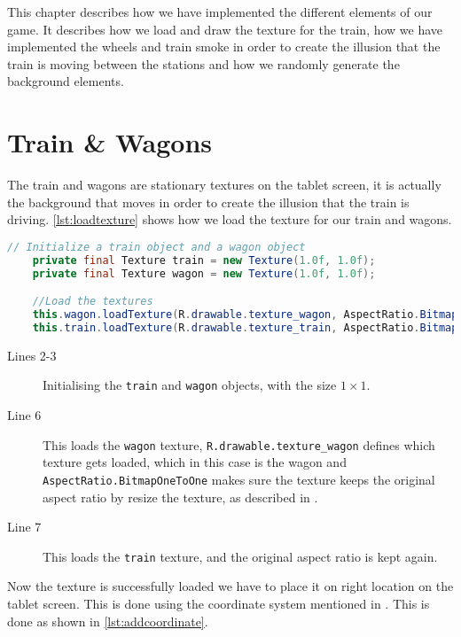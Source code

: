 This chapter describes how we have implemented the different elements of our game. It describes how we load and draw the texture for the train, how we have implemented the wheels and train smoke in order to create the illusion that the train is moving between the stations and how we randomly generate the background elements.



\section{Train \& Wagons}
The train and wagons are stationary textures on the tablet screen, it is actually the background that moves in order to create the illusion that the train is driving. \autoref{lst:loadtexture} shows how we load the texture for our train and wagons.

\begin{lstlisting}[language=java,firstnumber=1,caption={Loading the texture for our train and wagons.},label=lst:loadtexture] 
	// Initialize a train object and a wagon object
	private final Texture train = new Texture(1.0f, 1.0f);
	private final Texture wagon = new Texture(1.0f, 1.0f);

	//Load the textures
	this.wagon.loadTexture(R.drawable.texture_wagon, AspectRatio.BitmapOneToOne);
	this.train.loadTexture(R.drawable.texture_train, AspectRatio.BitmapOneToOne); 
\end{lstlisting}

\begin{description}
\item[Lines 2-3] Initialising the \lstinline|train| and \lstinline|wagon| objects, with the size $1 \times 1$.
\item[Line 6] This loads the \lstinline|wagon| texture, \lstinline|R.drawable.texture_wagon| defines which texture gets loaded, which in this case is the wagon and \lstinline|AspectRatio.BitmapOneToOne| makes sure the texture keeps the original aspect ratio by resize the texture, as described in .
\item[Line 7] This loads the \lstinline|train| texture, and the original aspect ratio is kept again.
\end{description}

Now the texture is successfully loaded we have to place it on right location on the tablet screen. This is done using the coordinate system mentioned in . This is done as shown in \autoref{lst:addcoordinate}.

